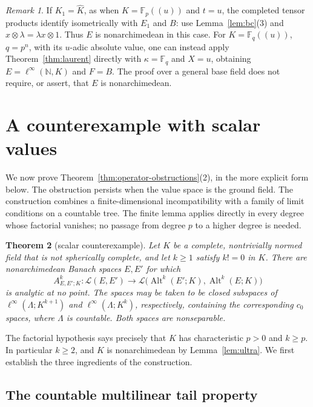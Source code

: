\documentclass[11pt]{amsart}
\newtheorem{theorem}{Theorem}[section]
\theoremstyle{definition}
\theoremstyle{remark}
\newtheorem{remark}[theorem]{Remark}
\numberwithin{equation}{section}
\newcommand{\N}{\mathbb N}
\newcommand{\F}{\mathbb F}
\newcommand{\cL}{\mathcal L}
\newcommand{\Alt}{\operatorname{Alt}}
\newcommand{\linf}{\ell^\infty}
\newcommand{\Kh}{\widehat K}
\begin{document}
\begin{remark}\label{rem:spaces}
If $K_1=\Kh$, as when $K=\F_p((u))$ and $t=u$, the completed tensor products identify isometrically with
$E_1$ and $B$: use Lemma~\ref{lem:bc}(3) and $x\otimes\lambda=\lambda x\otimes1$. Thus $E$ is nonarchimedean in
this case. For $K=\F_q((u))$, $q=p^n$, with its $u$\nobreakdash-adic absolute value, one can instead apply
Theorem~\ref{thm:laurent} directly with $\kappa=\F_q$ and $X=u$, obtaining $E=\linf(\N,K)$ and $F=B$.
The proof over a general base field does not require, or assert, that $E$ is nonarchimedean.
\end{remark}

\section{A counterexample with scalar values}\label{app:scalar}

We now prove Theorem~\ref{thm:operator-obstructions}(2), in the more explicit form below. The obstruction persists when the value space is the ground field. The construction combines a
finite-dimensional incompatibility with a family of limit conditions on a countable tree. The finite
lemma applies directly in every degree whose factorial vanishes; no passage from degree $p$ to a higher
degree is needed.

\begin{theorem}[scalar counterexample]\label{thm:scalar-counter}
Let $K$ be a complete, nontrivially normed field that is not spherically complete, and let $k\ge1$ satisfy
$k! = 0$ in $K$. There are nonarchimedean Banach spaces $E,E'$ for which
\[
 A^k_{E,E';K}\colon\cL(E,E')\longrightarrow
 \cL\bigl(\Alt^k(E';K),\Alt^k(E;K)\bigr)
\]
is analytic at no point. The spaces may be taken to be closed subspaces of
$\linf(\Lambda;K^{k+1})$ and $\linf(\Lambda;K^k)$, respectively, containing the corresponding $c_0$ spaces,
where $\Lambda$ is countable. Both spaces are nonseparable.
\end{theorem}

The factorial hypothesis says precisely that $K$ has characteristic $p>0$ and $k\ge p$. In particular
$k\ge2$, and $K$ is nonarchimedean by Lemma~\ref{lem:ultra}. We first establish the three ingredients
of the construction.

\subsection{The countable multilinear tail property}
\end{document}
